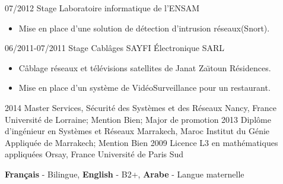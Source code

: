 \documentclass[9pt]{developercv} %
\begin{document}
\begin{entrylist}
{        }
	\entry
        {07/2012}
		{Stage}
		{Laboratoire informatique de l’ENSAM}
		{\vspace{-10pt}
        \begin{itemize}[noitemsep,topsep=0pt,parsep=0pt,partopsep=0pt, leftmargin=-1pt]
            \item Mise en place d’une solution de détection d’intrusion réseaux(Snort).
        \end{itemize}
        }
	\entry
        {06/2011-07/2011}
		{Stage Cablâges}
		{SAYFI Électronique SARL}
		{\vspace{-10pt}
        \begin{itemize}[noitemsep,topsep=0pt,parsep=0pt,partopsep=0pt, leftmargin=-1pt]
            \item Câblage réseaux et télévisions satellites de Janat Zaı̈toun Résidences.
            \item Mise en place d’un système de VidéoSurveillance pour un restaurant.
        \end{itemize}
        }
\end{entrylist}




\vspace{-10 pt}
\begin{entrylist}
    \entry
		{2014}
		{Master Services, Sécurité des Systèmes et des Réseaux}
		{Nancy, France}
		{Université de Lorraine; Mention Bien; Major de promotion}
    \entry
		{2013}
		{Diplôme d'ingénieur en Systèmes et Réseaux}
		{Marrakech, Maroc}
		{Institut du Génie Appliquée de Marrakech; Mention Bien}
	\entry
		{2009}
		{Licence L3 en mathématiques appliquées}
		{Orsay, France}
		{Université de Paris Sud }
\end{entrylist}
\vspace{-10 pt}
    \vspace{-6pt}
    
    \hspace{26mm} \textbf{Français} - Bilingue,\hspace{5mm} \textbf{English} - B2+,\hspace{5mm} \textbf{ Arabe} - Langue maternelle

\end{document}
